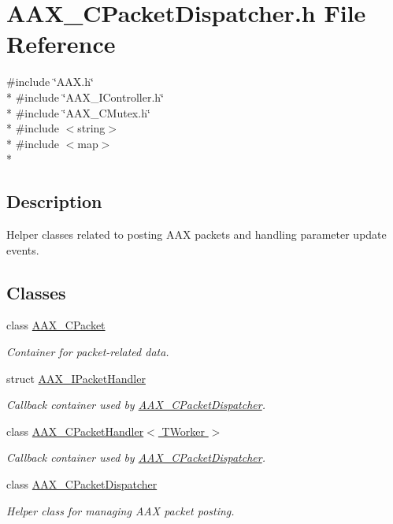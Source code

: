 \hypertarget{a00189}{}\section{A\+A\+X\+\_\+\+C\+Packet\+Dispatcher.\+h File Reference}
\label{a00189}
{\ttfamily \#include \char`\"{}A\+A\+X.\+h\char`\"{}}\\*
{\ttfamily \#include \char`\"{}A\+A\+X\+\_\+\+I\+Controller.\+h\char`\"{}}\\*
{\ttfamily \#include \char`\"{}A\+A\+X\+\_\+\+C\+Mutex.\+h\char`\"{}}\\*
{\ttfamily \#include $<$string$>$}\\*
{\ttfamily \#include $<$map$>$}\\*


\subsection{Description}
Helper classes related to posting A\+A\+X packets and handling parameter update events. 

\subsection*{Classes}
\begin{DoxyCompactItemize}
\item 
class \hyperlink{a00030}{A\+A\+X\+\_\+\+C\+Packet}
\begin{DoxyCompactList}\small\item\em Container for packet-\/related data. \end{DoxyCompactList}\item 
struct \hyperlink{a00106}{A\+A\+X\+\_\+\+I\+Packet\+Handler}
\begin{DoxyCompactList}\small\item\em Callback container used by \hyperlink{a00031}{A\+A\+X\+\_\+\+C\+Packet\+Dispatcher}. \end{DoxyCompactList}\item 
class \hyperlink{a00032}{A\+A\+X\+\_\+\+C\+Packet\+Handler$<$ T\+Worker $>$}
\begin{DoxyCompactList}\small\item\em Callback container used by \hyperlink{a00031}{A\+A\+X\+\_\+\+C\+Packet\+Dispatcher}. \end{DoxyCompactList}\item 
class \hyperlink{a00031}{A\+A\+X\+\_\+\+C\+Packet\+Dispatcher}
\begin{DoxyCompactList}\small\item\em Helper class for managing A\+A\+X packet posting. \end{DoxyCompactList}\end{DoxyCompactItemize}
